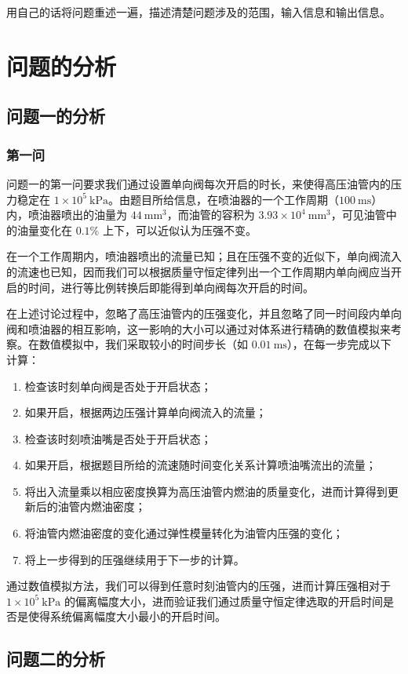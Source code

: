 \documentclass[18pt]{ctexart}
\newcommand{\prb}{\times 10^5~\mathrm{kPa}}
\newcommand{\vol}{~\mathrm{mm^3}}
\newcommand{\tim}{~\mathrm{ms}}
\begin{document}
用自己的话将问题重述一遍，描述清楚问题涉及的范围，输入信息和输出信息。
\newpage
\section{问题的分析}
\subsection{问题一的分析}
\subsubsection{第一问}
问题一的第一问要求我们通过设置单向阀每次开启的时长，来使得高压油管内的压力稳定在 $1\prb$。由题目所给信息，在喷油器的一个工作周期（$100\tim$）内，喷油器喷出的油量为 $44\vol$，而油管的容积为 $3.93\times 10^4\vol$，可见油管中的油量变化在 $0.1\%$ 上下，可以近似认为压强不变。

在一个工作周期内，喷油器喷出的流量已知；且在压强不变的近似下，单向阀流入的流速也已知，因而我们可以根据质量守恒定律列出一个工作周期内单向阀应当开启的时间，进行等比例转换后即能得到单向阀每次开启的时间。

在上述讨论过程中，忽略了高压油管内的压强变化，并且忽略了同一时间段内单向阀和喷油器的相互影响，这一影响的大小可以通过对体系进行精确的数值模拟来考察。在数值模拟中，我们采取较小的时间步长（如 $0.01\tim$），在每一步完成以下计算：

\begin{enumerate}
    \item 检查该时刻单向阀是否处于开启状态；
    \item 如果开启，根据两边压强计算单向阀流入的流量；
    \item 检查该时刻喷油嘴是否处于开启状态；
    \item 如果开启，根据题目所给的流速随时间变化关系计算喷油嘴流出的流量；
    \item 将出入流量乘以相应密度换算为高压油管内燃油的质量变化，进而计算得到更新后的油管内燃油密度；
    \item 将油管内燃油密度的变化通过弹性模量转化为油管内压强的变化；
    \item 将上一步得到的压强继续用于下一步的计算。
\end{enumerate}

通过数值模拟方法，我们可以得到任意时刻油管内的压强，进而计算压强相对于 $1\prb$ 的偏离幅度大小，进而验证我们通过质量守恒定律选取的开启时间是否是使得系统偏离幅度大小最小的开启时间。
\subsection{问题二的分析}
\end{document}

